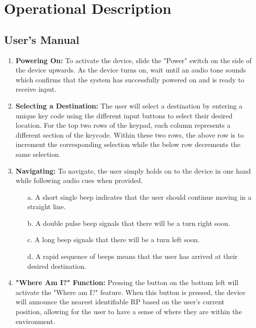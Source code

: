 \documentclass{article}
\begin{document}
\section{Operational Description}

\subsection{User's Manual}
\begin{enumerate}
    \item \textbf{Powering On:} To activate the device, slide the "Power" switch on the side of the device upwards. As the device turns on, wait until an audio tone sounds which confirms that the system has successfully powered on and is ready to receive input.
    \item \textbf{Selecting a Destination:} The user will select a destination by entering a unique key code using the different input buttons to select their desired location. For the top two rows of the keypad, each column represents a different section of the keycode. Within these two rows, the above row is to increment the corresponding selection while the below row decrements the same selection.
    \item \textbf{Navigating:} To navigate, the user simply holds on to the device in one hand while following audio cues when provided.
    \begin{itemize}
        \item[a.] A short single beep indicates that the user should continue moving in a straight line.
        \item[b.] A double pulse beep signals that there will be a turn right soon.
        \item[c.] A long beep signals that there will be a turn left soon.
        \item[d.] A rapid sequence of beeps means that the user has arrived at their desired destination.
    \end{itemize}
    \item \textbf{"Where Am I?" Function:} Pressing the button on the bottom left will activate the "Where am I?" feature. When this button is pressed, the device will announce the nearest identifiable RP based on the user's current position, allowing for the user to have a sense of where they are within the environment.
\end{enumerate}
\end{document}
